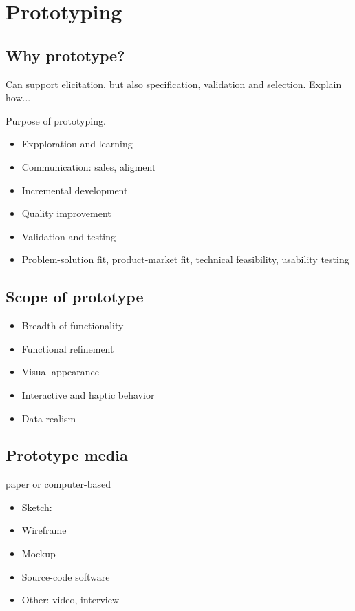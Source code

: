 \documentclass{reqengbook}
\begin{document}




\chapter{Prototyping}

\section{Why prototype?}

Can support elicitation, but also specification, validation and selection. Explain how...



Purpose of prototyping.

\begin{itemize}
  \item Expploration and learning
  \item Communication: sales, aligment
  \item Incremental development
  \item Quality improvement
  \item Validation and testing
  \item Problem-solution fit, product-market fit, technical feasibility, usability testing
\end{itemize}

\section{Scope of prototype}

\begin{itemize}
  \item Breadth of functionality
  \item Functional refinement
  \item Visual appearance
  \item Interactive and haptic behavior
  \item Data realism
\end{itemize}


\section{Prototype media}
paper or computer-based
\begin{itemize}
  \item Sketch: 
  \item Wireframe
  \item Mockup
  \item Source-code software
  \item Other: video, interview
\end{itemize}
\end{document}
